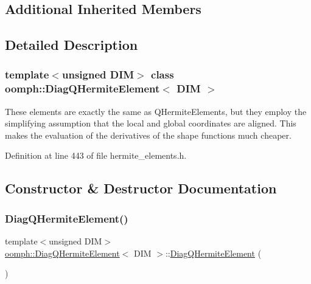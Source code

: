 \subsection*{Additional Inherited Members}


\subsection{Detailed Description}
\subsubsection*{template$<$unsigned D\+IM$>$\newline
class oomph\+::\+Diag\+Q\+Hermite\+Element$<$ D\+I\+M $>$}

These elements are exactly the same as Q\+Hermite\+Elements, but they employ the simplifying assumption that the local and global coordinates are aligned. This makes the evaluation of the derivatives of the shape functions much cheaper. 

Definition at line 443 of file hermite\+\_\+elements.\+h.



\subsection{Constructor \& Destructor Documentation}
\mbox{\label{classoomph_1_1DiagQHermiteElement_a49b5a9df09fa243aa9cfe8df37bcfe92}} 
\subsubsection{\texorpdfstring{Diag\+Q\+Hermite\+Element()}{DiagQHermiteElement()}\hspace{0.1cm}{\footnotesize\ttfamily [1/2]}}
{\footnotesize\ttfamily template$<$unsigned D\+IM$>$ \\
\hyperlink{classoomph_1_1DiagQHermiteElement}{oomph\+::\+Diag\+Q\+Hermite\+Element}$<$ D\+IM $>$\+::\hyperlink{classoomph_1_1DiagQHermiteElement}{Diag\+Q\+Hermite\+Element} (\begin{DoxyParamCaption}{ }\end{DoxyParamCaption})\hspace{0.3cm}{\ttfamily [inline]}}




